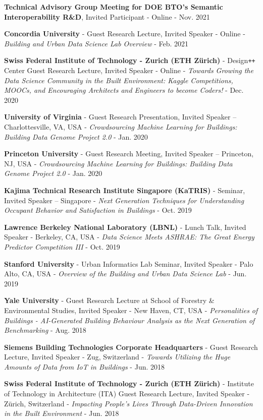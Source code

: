 \documentclass[10pt,a4paper]{article}
\begin{document}
\begin{small}
\begin{etaremune}
\item
\textbf{Technical Advisory Group Meeting for DOE BTO’s Semantic Interoperability R\&D}, Invited Participant - Online - Nov. 2021
\item
\textbf{Concordia University} - Guest Research Lecture, Invited Speaker - Online - \emph{Building and Urban Data Science Lab Overview} - Feb. 2021
\item
\textbf{Swiss Federal Institute of Technology - Zurich (ETH Z{\"u}rich)} - Design\texttt{+}\texttt{+} Center Guest Research Lecture, Invited Speaker - Online - \emph{Towards Growing the Data Science Community in the Built Environment: Kaggle Competitions, MOOCs, and Encouraging Architects and Engineers to become Coders!} - Dec. 2020 
\item
\textbf{University of Virginia} - Guest Research Presentation, Invited Speaker – Charlottesville, VA, USA - \emph{Crowdsourcing Machine Learning for Buildings: Building Data Genome Project 2.0} - Jan. 2020
\item
\textbf{Princeton University} - Guest Research Meeting, Invited Speaker – Princeton, NJ, USA - \emph{Crowdsourcing Machine Learning for Buildings: Building Data Genome Project 2.0} - Jan. 2020
\item
\textbf{Kajima Technical Research Institute Singapore (KaTRIS)} - Seminar, Invited Speaker – Singapore - \emph{Next Generation Techniques for Understanding Occupant Behavior and Satisfaction in Buildings} - Oct. 2019
\item
\textbf{Lawrence Berkeley National Laboratory (LBNL)} - Lunch Talk, Invited Speaker - Berkeley, CA, USA - \emph{Data Science Meets ASHRAE: The Great Energy Predictor Competition III} - Oct. 2019
\item
\textbf{Stanford University} - Urban Informatics Lab Seminar, Invited Speaker - Palo Alto, CA, USA - \emph{Overview of the Building and Urban Data Science Lab} - Jun. 2019
\item
\textbf{Yale University} - Guest Research Lecture at School of Forestry \& Environmental Studies, Invited Speaker - New Haven, CT, USA - \emph{Personalities of Buildings - AI-Generated Building Behaviour Analysis as the Next Generation of Benchmarking} - Aug. 2018
\item
\textbf{Siemens Building Technologies Corporate Headquarters} - Guest Research Lecture, Invited Speaker - Zug, Switzerland - \emph{Towards Utilizing the Huge Amounts of Data from IoT in Buildings} - Jun. 2018
\item
\textbf{Swiss Federal Institute of Technology - Zurich (ETH Z{\"u}rich)} - Institute of Technology in Architecture (ITA) Guest Research Lecture, Invited Speaker - Z{\"u}rich, Switzerland - \emph{Impacting People’s Lives Through Data-Driven Innovation in the Built Environment} - Jun. 2018

\end{etaremune}
\end{small}
\end{document}
